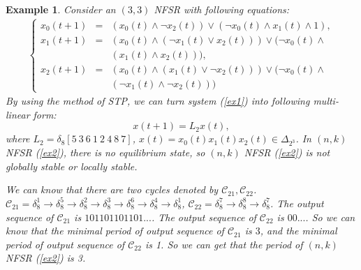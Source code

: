 \documentclass[conference]{IEEEtran}
\newtheorem{example}{Example}
\begin{document}
\begin{example}
Consider an $(3,3)$ NFSR with following equations:
\begin{eqnarray}\label{ex2}
 \left\{ \begin{array}{lcl}
x_0(t+1)&=&(x_0(t)\wedge \neg x_2(t))\vee (\neg x_0(t)\wedge x_1(t)\wedge 1),\\
x_1(t+1)&=&(x_0(t)\wedge (\neg x_1(t)\vee x_2(t)))\vee(\neg x_0(t)\wedge \\
&&( x_1(t)\wedge x_2(t))),\\
x_{2}(t+1)&=&(x_0(t)\wedge (x_1(t)\vee \neg x_2(t)))\vee(\neg x_0(t)\wedge\\
&&(\neg x_1(t)\wedge \neg x_2(t)))
\end{array} \right.
\end{eqnarray}
By using the method of STP, we can turn system (\ref{ex1}) into following multi-linear form:
\begin{equation}
x(t+1)=L_2x(t),
\end{equation}
where $L_2=\delta_8[5~3~6~1~2~4~8~7]$, $x(t)=x_0(t)x_1(t)x_2(t)\in \Delta_{2^3}$.
In $(n,k)$ NFSR (\ref{ex2}), there is no equilibrium state, so $(n,k)$ NFSR (\ref{ex2}) is not globally stable or locally stable.

We can know that there are two cycles denoted by $\mathcal{C}_{21}, \mathcal{C}_{22}$. $\mathcal{C}_{21}=\delta^1_8\rightarrow \delta^5_8\rightarrow \delta^2_8\rightarrow \delta^3_8\rightarrow \delta^6_8\rightarrow \delta^4_8\rightarrow \delta^1_8$, $\mathcal{C}_{22}=\delta^7_8\rightarrow \delta^8_8\rightarrow\delta^7_8$. The output sequence of $\mathcal{C}_{21}$ is $101101101101...$. The output sequence of $\mathcal{C}_{22}$ is $00...$. So we can know that the minimal period of output sequence of $\mathcal{C}_{21}$ is $3$, and the minimal period of output sequence of $\mathcal{C}_{22}$ is 1.
So we can get that the period of $(n,k)$ NFSR (\ref{ex2}) is 3.
\end{example}
\end{document}
